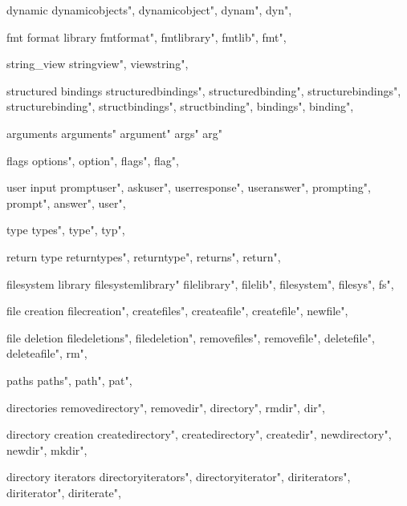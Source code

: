          dynamic 
        dynamicobjects",
        dynamicobject",
        dynam",
        dyn",
        
         fmt format library
        fmtformat",
        fmtlibrary",
        fmtlib",
        fmt",
          
         string_view
        stringview",
        viewstring",
        
         structured bindings
        structuredbindings",
        structuredbinding", 
        structurebindings", 
        structurebinding",
        structbindings",
        structbinding",
        bindings",
        binding",
        
         arguments 
        arguments"
        argument"
        args"
        arg"
        
         flags 
        options",
        option",
        flags",
        flag",
        
         user input 
        promptuser",  
        askuser",  
        userresponse",  
        useranswer",  
        prompting",  
        prompt",  
        answer",  
        user",  
        
         type 
        types",  
        type",  
        typ",  
        
         return type 
        returntypes", 
        returntype", 
        returns", 
        return", 
        
         filesystem library
        filesystemlibrary"
        filelibrary",
        filelib",
        filesystem",
        filesys",
        fs",
         
         file creation 
        filecreation",
        createfiles", 
        createafile",
        createfile",
        newfile", 
        
         file deletion 
        filedeletions",
        filedeletion", 
        removefiles",
        removefile",
        deletefile",
        deleteafile",
        rm",
        
         paths 
        paths", 
        path", 
        pat",
        
         directories
        removedirectory",
        removedir",
        directory",
        rmdir",
        dir",

         directory creation
        createdirectory",  
        createdirectory",  
        createdir",  
        newdirectory",  
        newdir",  
        mkdir",  
        
         directory iterators 
        directoryiterators",  
        directoryiterator",  
        diriterators",  
        diriterator",  
        diriterate",  
        
